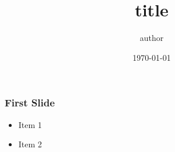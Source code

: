 \documentclass[10pt,professionalfonts,serif,usenames,dvipsnames,svgnames,table]{beamer}
\title{title}
\author[author]{author}
\date[\today]{\today}
\institute[ABC]{ABC Institute}
\begin{document}
\frame{\titlepage}

\begin{frame}
    \frametitle{First Slide}
    \begin{itemize}
        \item Item 1
        \item Item 2
    \end{itemize}
\end{frame}
\end{document}
